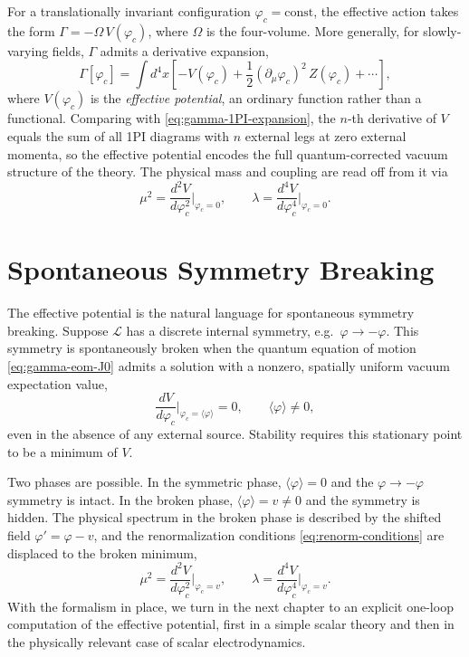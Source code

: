 For a translationally invariant configuration $\varphi_c = \text{const}$, the
effective action takes the form $\Gamma = -\Omega\,V(\varphi_c)$, where $\Omega$
is the four-volume. More generally, for slowly-varying fields, $\Gamma$ admits
a derivative expansion,
\begin{equation}
    \Gamma[\varphi_c] = \int d^4x\left[
        -V(\varphi_c)
        + \frac{1}{2}(\partial_\mu\varphi_c)^2\, Z(\varphi_c)
        + \cdots\right],
    \label{eq:gamma-derivative-expansion}
\end{equation}
where $V(\varphi_c)$ is the \emph{effective potential}, an ordinary function
rather than a functional. Comparing with \eqref{eq:gamma-1PI-expansion}, the
$n$-th derivative of $V$ equals the sum of all 1PI diagrams with $n$ external
legs at zero external momenta, so the effective potential encodes the full
quantum-corrected vacuum structure of the theory. The physical mass and coupling
are read off from it via
\begin{equation}
    \mu^2 = \frac{d^2V}{d\varphi_c^2}\bigg|_{\varphi_c=0},
    \qquad
    \lambda = \frac{d^4V}{d\varphi_c^4}\bigg|_{\varphi_c=0}.
    \label{eq:renorm-conditions}
\end{equation}


\section{Spontaneous Symmetry Breaking}
\label{sec:ssb}

The effective potential is the natural language for spontaneous symmetry
breaking. Suppose $\mathcal{L}$ has a discrete internal symmetry,
e.g.\ $\varphi \to -\varphi$. This symmetry is spontaneously broken when the
quantum equation of motion \eqref{eq:gamma-eom-J0} admits a solution with a
nonzero, spatially uniform vacuum expectation value,
\begin{equation}
    \frac{dV}{d\varphi_c}\bigg|_{\varphi_c = \langle\varphi\rangle} = 0,
    \qquad \langle\varphi\rangle \neq 0,
    \label{eq:ssb-condition-potential}
\end{equation}
even in the absence of any external source. Stability requires this stationary
point to be a minimum of $V$.

Two phases are possible. In the symmetric phase, $\langle\varphi\rangle = 0$
and the $\varphi\to-\varphi$ symmetry is intact. In the broken phase,
$\langle\varphi\rangle = v \neq 0$ and the symmetry is hidden. The physical
spectrum in the broken phase is described by the shifted field
$\varphi' = \varphi - v$, and the renormalization conditions
\eqref{eq:renorm-conditions} are displaced to the broken minimum,
\begin{equation}
    \mu^2 = \frac{d^2V}{d\varphi_c^2}\bigg|_{\varphi_c=v},
    \qquad
    \lambda = \frac{d^4V}{d\varphi_c^4}\bigg|_{\varphi_c=v}.
    \label{eq:ssb-mass-coupling}
\end{equation}
With the formalism in place, we turn in the next chapter to an explicit
one-loop computation of the effective potential, first in a simple scalar
theory and then in the physically relevant case of scalar electrodynamics.
